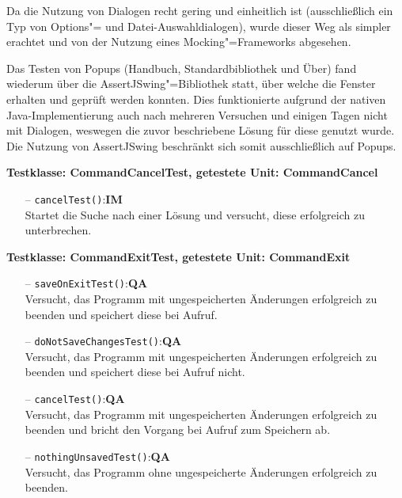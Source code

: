 \documentclass[parskip=full,11pt,twoside]{scrartcl}
\def\qa{\hfill\textbf{QA}}
\def\impl{\hfill\textbf{IM}}
\begin{document}
Da die Nutzung von Dialogen recht gering und einheitlich ist (ausschließlich ein Typ von Options"= und Datei-Auswahldialogen), wurde dieser Weg als simpler erachtet und von der Nutzung eines Mocking"=Frameworks abgesehen.

Das Testen von Popups (Handbuch, Standardbibliothek und Über) fand wiederum über die AssertJSwing"=Bibliothek statt, über welche die Fenster erhalten und geprüft werden konnten. Dies funktionierte aufgrund der nativen Java-Implementierung auch nach mehreren Versuchen und einigen Tagen nicht mit Dialogen, weswegen die zuvor beschriebene Lösung für diese genutzt wurde. Die Nutzung von AssertJSwing beschränkt sich somit ausschließlich auf Popups.

\textbf{Testklasse: CommandCancelTest, getestete Unit: CommandCancel}
\begin{itemize}
	\item[--] \texttt{cancelTest()}:\impl\\
	Startet die Suche nach einer Lösung und versucht, diese erfolgreich zu unterbrechen.
\end{itemize}

\textbf{Testklasse: CommandExitTest, getestete Unit: CommandExit}
\begin{itemize}
	\item[--] \texttt{saveOnExitTest()}:\qa\\
	Versucht, das Programm mit ungespeicherten Änderungen erfolgreich zu beenden und speichert diese bei Aufruf.
	\item[--] \texttt{doNotSaveChangesTest()}:\qa\\
	Versucht, das Programm mit ungespeicherten Änderungen erfolgreich zu beenden und speichert diese bei Aufruf nicht.
	\item[--] \texttt{cancelTest()}:\qa\\
	Versucht, das Programm mit ungespeicherten Änderungen erfolgreich zu beenden und bricht den Vorgang bei Aufruf zum Speichern ab.
	\item[--] \texttt{nothingUnsavedTest()}:\qa\\
	Versucht, das Programm ohne ungespeicherte Änderungen erfolgreich zu beenden.
\end{itemize}
\end{document}
